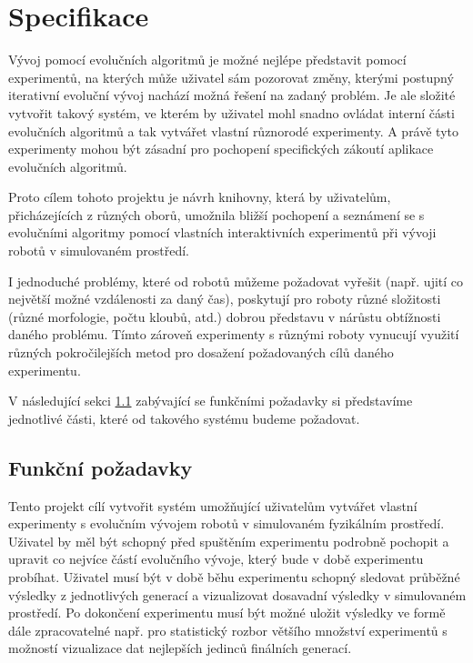 \chapter{Specifikace} \label{chapter-specifikace}

Vývoj pomocí evolučních algoritmů je možné nejlépe představit pomocí
experimentů, na kterých může uživatel sám pozorovat změny, kterými postupný
iterativní evoluční vývoj nachází možná řešení na zadaný problém. Je ale
složité vytvořit takový systém, ve kterém by uživatel mohl snadno ovládat
interní části evolučních algoritmů a tak vytvářet vlastní různorodé
experimenty. A právě tyto experimenty mohou být zásadní pro pochopení
specifických zákoutí aplikace evolučních algoritmů.

Proto cílem tohoto projektu je návrh knihovny, která by uživatelům,
přicházejících z různých oborů, umožnila bližší pochopení a seznámení se s
evolučními algoritmy pomocí vlastních interaktivních experimentů při vývoji
robotů v simulovaném prostředí. 

I jednoduché problémy, které od robotů můžeme požadovat vyřešit (např. ujití co
největší možné vzdálenosti za daný čas), poskytují pro roboty různé složitosti
(různé morfologie, počtu kloubů, atd.) dobrou představu v nárůstu obtížnosti
daného problému. Tímto zároveň experimenty s různými roboty vynucují využití
různých pokročilejších metod pro dosažení požadovaných cílů daného experimentu.

V následující sekci \ref{Specifikace-funkčnípožadavky} zabývající se funkčními
požadavky si představíme jednotlivé části, které od takového systému budeme
požadovat.

\section{Funkční požadavky} \label{Specifikace-funkčnípožadavky}

Tento projekt cílí vytvořit systém umožňující uživatelům vytvářet vlastní
experimenty s evolučním vývojem robotů v simulovaném fyzikálním prostředí.
Uživatel by měl být schopný před spuštěním experimentu podrobně pochopit a
upravit co nejvíce částí evolučního vývoje, který bude v době experimentu
probíhat. Uživatel musí být v době běhu experimentu schopný sledovat průběžné
výsledky z jednotlivých generací a vizualizovat dosavadní výsledky v
simulovaném prostředí. Po dokončení experimentu musí být možné uložit
výsledky ve formě dále zpracovatelné např. pro statistický rozbor většího
množství experimentů s možností vizualizace dat nejlepších jedinců finálních
generací.

